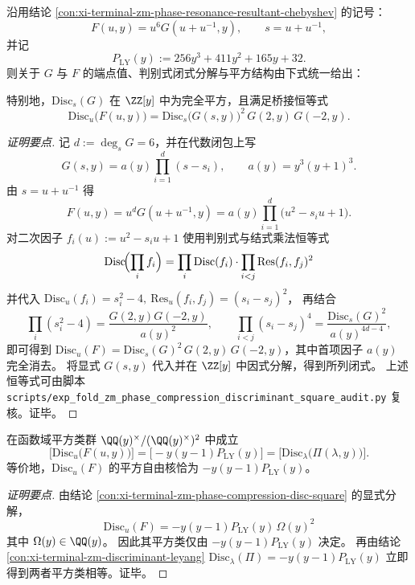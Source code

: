 \begin{conclusion}[相位共振判别式的闭式分解与平方结构]\label{con:xi-terminal-zm-phase-compression-disc-square}
沿用结论 \ref{con:xi-terminal-zm-phase-resonance-resultant-chebyshev} 的记号：
\[
F(u,y)=u^{6}G(u+u^{-1},y),\qquad s=u+u^{-1},
\]
并记
\[
P_{\mathrm{LY}}(y):=256y^{3}+411y^{2}+165y+32.
\]
则关于 \(G\) 与 \(F\) 的端点值、判别式闭式分解与平方结构由下式统一给出：

特别地，\(\mathrm{Disc}_{s}(G)\) 在 \(\ZZ[y]\) 中为完全平方，且满足桥接恒等式
\[
\mathrm{Disc}_{u}\bigl(F(u,y)\bigr)=\mathrm{Disc}_{s}\bigl(G(s,y)\bigr)^2\,G(2,y)\,G(-2,y).
\]
\end{conclusion}
\begin{proof}[证明要点]
记 \(d:=\deg_s G=6\)，并在代数闭包上写
\[
G(s,y)=a(y)\prod_{i=1}^{d}(s-s_i),\qquad a(y)=y^{3}(y+1)^{3}.
\]
由 \(s=u+u^{-1}\) 得
\[
F(u,y)=u^{d}G(u+u^{-1},y)=a(y)\prod_{i=1}^{d}\bigl(u^{2}-s_i u+1\bigr).
\]
对二次因子 \(f_i(u):=u^2-s_i u+1\) 使用判别式与结式乘法恒等式
\[
\mathrm{Disc}\!\Bigl(\prod_i f_i\Bigr)=\prod_i \mathrm{Disc}(f_i)\cdot \prod_{i<j}\mathrm{Res}(f_i,f_j)^2
\]
并代入
\(
\mathrm{Disc}_u(f_i)=s_i^2-4,\ 
\mathrm{Res}_u(f_i,f_j)=(s_i-s_j)^2
\)，
再结合
\[
\prod_i(s_i^2-4)=\frac{G(2,y)G(-2,y)}{a(y)^2},\qquad
\prod_{i<j}(s_i-s_j)^4=\frac{\mathrm{Disc}_s(G)^2}{a(y)^{4d-4}},
\]
即可得到
\(
\mathrm{Disc}_u(F)=\mathrm{Disc}_s(G)^2\,G(2,y)\,G(-2,y)
\)，其中首项因子 \(a(y)\) 完全消去。
将显式 \(G(s,y)\) 代入并在 \(\ZZ[y]\) 中因式分解，得到所列闭式。
上述恒等式可由脚本 \texttt{scripts/exp\_fold\_zm\_phase\_compression\_discriminant\_square\_audit.py} 复核。证毕。
\end{proof}

\begin{conclusion}\label{con:xi-terminal-zm-phase-compression-disc-squareclass-invariance}
在函数域平方类群 \(\QQ(y)^{\times}/(\QQ(y)^{\times})^{2}\) 中成立
\[
\bigl[\mathrm{Disc}_{u}\bigl(F(u,y)\bigr)\bigr]
=\bigl[-y(y-1)P_{\mathrm{LY}}(y)\bigr]
=\bigl[\mathrm{Disc}_{\lambda}\bigl(\Pi(\lambda,y)\bigr)\bigr].
\]
等价地，\(\mathrm{Disc}_{u}(F)\) 的平方自由核恰为 \(-y(y-1)P_{\mathrm{LY}}(y)\)。
\end{conclusion}
\begin{proof}[证明要点]
由结论 \ref{con:xi-terminal-zm-phase-compression-disc-square} 的显式分解，
\[
\mathrm{Disc}_{u}(F)
=-y(y-1)P_{\mathrm{LY}}(y)\,\Omega(y)^2
\]
其中 \(\Omega(y)\in\QQ(y)\)。
因此其平方类仅由 \(-y(y-1)P_{\mathrm{LY}}(y)\) 决定。
再由结论 \ref{con:xi-terminal-zm-discriminant-leyang}
\(
\mathrm{Disc}_{\lambda}(\Pi)=-y(y-1)P_{\mathrm{LY}}(y)
\)
立即得到两者平方类相等。证毕。
\end{proof}

